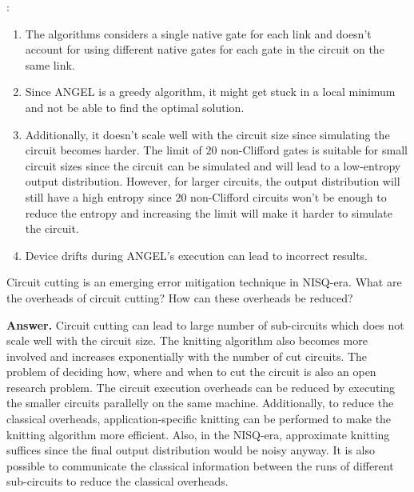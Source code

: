 :
\begin{enumerate}
    \item The algorithms considers a single native gate for each link and doesn't account for using different native gates for each gate in the circuit on the same link.
    \item Since ANGEL is a greedy algorithm, it might get stuck in a local minimum and not be able to find the optimal solution.
    \item Additionally, it doesn't scale well with the circuit size since simulating the circuit becomes harder. The limit of $20$ non-Clifford gates is suitable for small circuit sizes since the circuit can be simulated and will lead to a low-entropy output distribution. However, for larger circuits, the output distribution will still have a high entropy since $20$ non-Clifford circuits won't be enough to reduce the entropy and increasing the limit will make it harder to simulate the circuit.
    \item Device drifts during ANGEL's execution can lead to incorrect results.
\end{enumerate}

\tcbline{}

\begin{question}
    Circuit cutting is an emerging error mitigation technique in NISQ-era. What are the overheads of circuit cutting? How can these overheads be reduced?
\end{question}
\textbf{Answer.} Circuit cutting can lead to large number of sub-circuits which does not scale well with the circuit size. The knitting algorithm also becomes more involved and increases exponentially with the number of cut circuits. The problem of deciding how, where and when to cut the circuit is also an open research problem. The circuit execution overheads can be reduced by executing the smaller circuits parallelly on the same machine. Additionally, to reduce the classical overheads, application-specific knitting can be performed to make the knitting algorithm more efficient. Also, in the NISQ-era, approximate knitting suffices since the final output distribution would be noisy anyway. It is also possible to communicate the classical information between the runs of different sub-circuits to reduce the classical overheads.